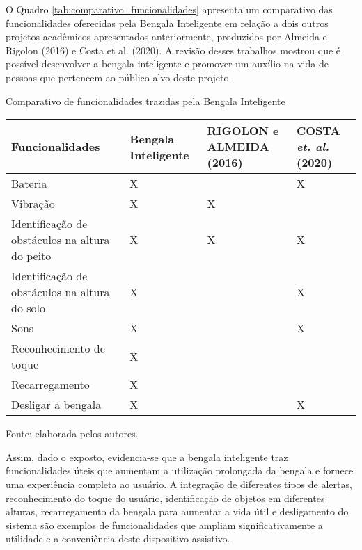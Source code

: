     
    O Quadro \ref{tab:comparativo_funcionalidades} apresenta um comparativo das funcionalidades oferecidas pela Bengala Inteligente em relação a dois outros projetos acadêmicos apresentados anteriormente, produzidos por Almeida e Rigolon (2016) e Costa et al. (2020). A revisão desses trabalhos mostrou que é possível desenvolver a bengala inteligente e promover um auxílio na vida de pessoas que pertencem ao público-alvo deste projeto.

        \begin{quadro}[!ht]    
            \captionsetup{width=1.0\textwidth} %
            \caption{Comparativo de funcionalidades trazidas pela Bengala Inteligente}    
            \begin{tabular}{p{}p{}p{}p{}} %

                \toprule
                Funcionalidades & Bengala Inteligente & RIGOLON e ALMEIDA (2016) & COSTA \textit{et. al.} (2020)  \\
                \midrule
                Bateria                                                 & X  &    & X  \\
                Vibração                                                & X  &  X &    \\
                Identificação de obstáculos na altura do peito          & X  &  X & X  \\
                Identificação de obstáculos na altura do solo           & X  &    & X  \\
                Sons                                                    & X  &    & X  \\
                Reconhecimento de toque                                 & X  &    &    \\
                Recarregamento                                          & X  &    &    \\
                Desligar a bengala                                      & X  &    & X  \\
                \bottomrule
            \end{tabular}
            \caption*{Fonte: elaborada pelos autores.} %
            \label{tab:comparativo_funcionalidades}

        \end{quadro}
    Assim, dado o exposto, evidencia-se que a bengala inteligente traz funcionalidades úteis que aumentam a utilização prolongada da bengala e fornece uma experiência completa ao usuário. A integração de diferentes tipos de alertas, reconhecimento do toque do usuário, identificação de objetos em diferentes alturas, recarregamento da bengala para aumentar a vida útil e desligamento do sistema são exemplos de funcionalidades que ampliam significativamente a utilidade e a conveniência deste dispositivo assistivo.

